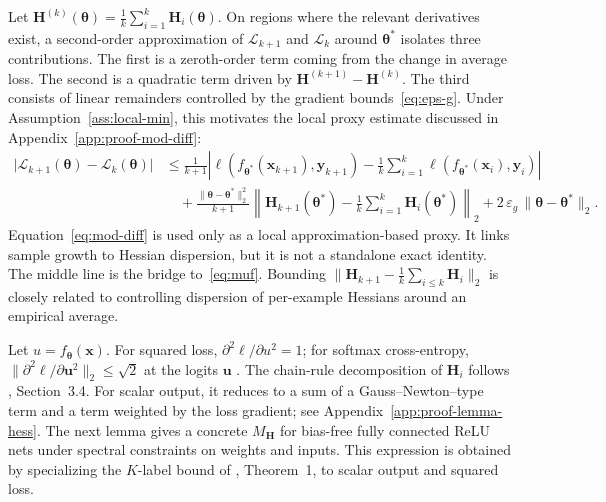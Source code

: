 \documentclass[10pt,letterpaper]{article}
\theoremstyle{definition}
\begin{document}
Let $\mathbf{H}^{(k)}(\boldsymbol{\theta})=\frac{1}{k}\sum_{i=1}^{k}\mathbf{H}_i(\boldsymbol{\theta})$.
On regions where the relevant derivatives exist, a second-order approximation of $\mathcal{L}_{k+1}$ and $\mathcal{L}_k$ around $\boldsymbol{\theta}^*$ isolates three contributions. The first is a zeroth-order term coming from the change in average loss. The second is a quadratic term driven by $\mathbf{H}^{(k+1)}-\mathbf{H}^{(k)}$. The third consists of linear remainders controlled by the gradient bounds~\eqref{eq:eps-g}.
Under Assumption~\ref{ass:local-min}, this motivates the local proxy estimate discussed in Appendix~\ref{app:proof-mod-diff}:
\begin{align}\label{eq:mod-diff}
  \bigl|\mathcal{L}_{k+1}(\boldsymbol{\theta}) - \mathcal{L}_k(\boldsymbol{\theta})\bigr|
  &\le \frac{1}{k+1}
  \left|
    \ell(f_{\boldsymbol{\theta}^*}(\mathbf{x}_{k+1}),\mathbf{y}_{k+1})
    - \frac{1}{k}\sum_{i=1}^{k}\ell(f_{\boldsymbol{\theta}^*}(\mathbf{x}_{i}),\mathbf{y}_{i})
  \right|
  \nonumber\\
  &\quad + \frac{\|\boldsymbol{\theta}-\boldsymbol{\theta}^*\|_2^2}{k+1}
  \left\| \mathbf{H}_{k+1}(\boldsymbol{\theta}^*) - \frac{1}{k}\sum_{i=1}^{k}\mathbf{H}_{i}(\boldsymbol{\theta}^*) \right\|_2
  + 2\,\varepsilon_g\,\|\boldsymbol{\theta}-\boldsymbol{\theta}^*\|_2 .
\end{align}
Equation~\eqref{eq:mod-diff} is used only as a local approximation-based proxy. It links sample growth to Hessian dispersion, but it is not a standalone exact identity.
The middle line is the bridge to~\eqref{eq:muf}. Bounding $\|\mathbf{H}_{k+1}-\frac{1}{k}\sum_{i\le k}\mathbf{H}_i\|_2$ is closely related to controlling dispersion of per-example Hessians around an empirical average.

Let $u=f_{\boldsymbol{\theta}}(\mathbf{x})$. For squared loss, $\partial^2 \ell/\partial u^2=1$; for softmax
cross-entropy, $\|\partial^2 \ell/\partial \mathbf{u}^2\|_2\le\sqrt{2}$ at the logits $\mathbf{u}$
\cite{kiselev2024hessian}.
The chain-rule decomposition of $\mathbf{H}_i$ follows \cite{kiselev2024hessian}, Section~3.4. For scalar output, it reduces to a sum of a Gauss--Newton--type term and a term weighted by the loss gradient; see Appendix~\ref{app:proof-lemma-hess}.
The next lemma gives a concrete $M_{\mathbf{H}}$ for bias-free fully connected ReLU nets under spectral constraints on weights and inputs. This expression is obtained by specializing the $K$-label bound of \cite{kiselev2024hessian}, Theorem~1, to scalar output and squared loss.
\end{document}
